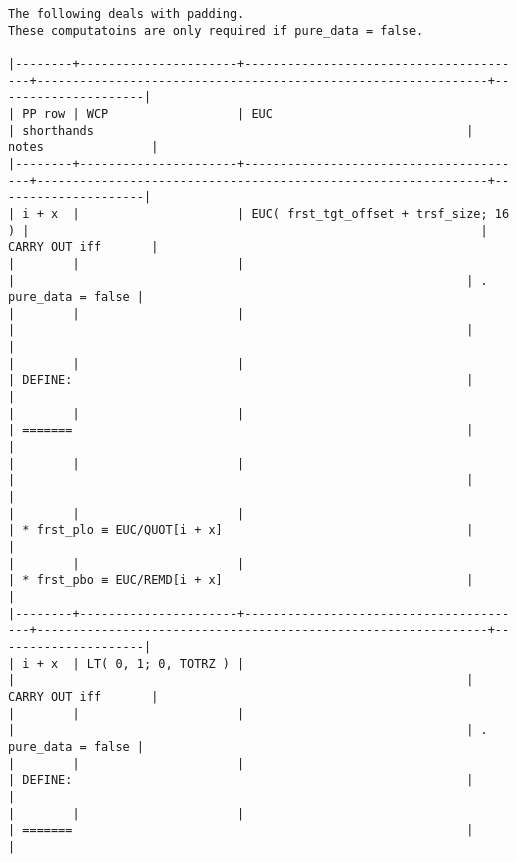 \documentclass[varwidth=\maxdimen,margin=0.5cm,multi={verbatim}]{standalone}
\begin{document}
\begin{verbatim}
The following deals with padding.
These computatoins are only required if pure_data = false.

|--------+----------------------+----------------------------------------+---------------------------------------------------------------+---------------------|
| PP row | WCP                  | EUC                                    | shorthands                                                    | notes               |
|--------+----------------------+----------------------------------------+---------------------------------------------------------------+---------------------|
| i + x  |                      | EUC( frst_tgt_offset + trsf_size; 16 ) |                                                               | CARRY OUT iff       |
|        |                      |                                        |                                                               | . pure_data = false |
|        |                      |                                        |                                                               |                     |
|        |                      |                                        | DEFINE:                                                       |                     |
|        |                      |                                        | =======                                                       |                     |
|        |                      |                                        |                                                               |                     |
|        |                      |                                        | * frst_plo ≡ EUC/QUOT[i + x]                                  |                     |
|        |                      |                                        | * frst_pbo ≡ EUC/REMD[i + x]                                  |                     |
|--------+----------------------+----------------------------------------+---------------------------------------------------------------+---------------------|
| i + x  | LT( 0, 1; 0, TOTRZ ) |                                        |                                                               | CARRY OUT iff       |
|        |                      |                                        |                                                               | . pure_data = false |
|        |                      |                                        | DEFINE:                                                       |                     |
|        |                      |                                        | =======                                                       |                     |

\end{verbatim}
\end{document}
